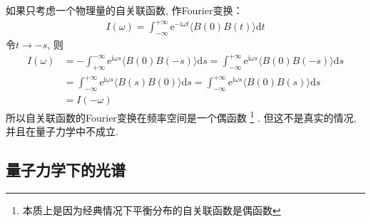     如果只考虑一个物理量的自关联函数, 作Fourier变换：
    \begin{equation}\begin{aligned}
    I(\omega) = \int_{-\infty}^{+\infty} \mathrm{e}^{-\mathrm{i}\omega t} \langle B(0)B(t) \rangle \mathrm{d}t
    \end{aligned}\end{equation}
    令$t \to -s$, 则
    \begin{equation}\begin{aligned}
    I(\omega) 
    &= -\int_{+\infty}^{-\infty} \mathrm{e}^{\mathrm{i}\omega s} \langle B(0)B(-s) \rangle \mathrm{d}s
    =  \int_{-\infty}^{+\infty} \mathrm{e}^{\mathrm{i}\omega s} \langle B(0)B(-s) \rangle \mathrm{d}s\\
    &= \int_{-\infty}^{+\infty} \mathrm{e}^{\mathrm{i}\omega s} \langle B(s)B(0) \rangle \mathrm{d}s
    =  \int_{-\infty}^{+\infty} \mathrm{e}^{\mathrm{i}\omega s} \langle B(0)B(s) \rangle \mathrm{d}s\\
    &= I(-\omega)
    \end{aligned}\end{equation}
    所以自关联函数的Fourier变换在频率空间是一个偶函数
    \footnote{本质上是因为经典情况下平衡分布的自关联函数是偶函数}
    . 但这不是真实的情况, 并且在量子力学中不成立.

    \subsection{量子力学下的光谱}

